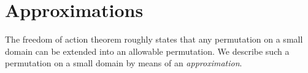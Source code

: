 \section{Approximations}

The freedom of action theorem roughly states that any permutation on a small domain can be extended into an allowable permutation.
We describe such a permutation on a small domain by means of an \emph{approximation}.




